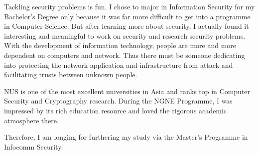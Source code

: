 
Tackling security problems is fun.
I chose to major in Information Security for my Bachelor's Degree only because it was far more difficult to get into a programme in Computer Science.
But after learning more about security, I actually found it interesting and meaningful to work on security and research security problems.
With the development of information technology, people are more and more dependent on computers and network.
Thus there must be someone dedicating into protecting the network application and infrastructure from attack and facilitating trusts between unknown people.

NUS is one of the most excellent universities in Asia and ranks top in Computer Security and Cryptography research.
During the NGNE Programme, I was impressed by its rich education resource and loved the rigorous academic atmosphere there.

Therefore, I am longing for furthering my study via the Master's Programme in Infocomm Security.






